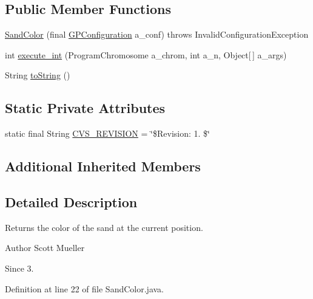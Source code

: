 \subsection*{Public Member Functions}
\begin{DoxyCompactItemize}
\item 
\hyperlink{classexamples_1_1gp_1_1painted_desert_1_1_sand_color_a8f1ed8fa161f20e7d178cb70041ea832}{Sand\-Color} (final \hyperlink{classorg_1_1jgap_1_1gp_1_1impl_1_1_g_p_configuration}{G\-P\-Configuration} a\-\_\-conf)  throws Invalid\-Configuration\-Exception 
\item 
int \hyperlink{classexamples_1_1gp_1_1painted_desert_1_1_sand_color_a5165d0fbe17b9d4e76e1e072739db6df}{execute\-\_\-int} (Program\-Chromosome a\-\_\-chrom, int a\-\_\-n, Object\mbox{[}$\,$\mbox{]} a\-\_\-args)
\item 
String \hyperlink{classexamples_1_1gp_1_1painted_desert_1_1_sand_color_af4b2de79f0c7496bc4f1a78e0c5d791b}{to\-String} ()
\end{DoxyCompactItemize}
\subsection*{Static Private Attributes}
\begin{DoxyCompactItemize}
\item 
static final String \hyperlink{classexamples_1_1gp_1_1painted_desert_1_1_sand_color_af06a8f8f70839b3a29cc1b023e138456}{C\-V\-S\-\_\-\-R\-E\-V\-I\-S\-I\-O\-N} = \char`\"{}\$Revision\-: 1. \$\char`\"{}
\end{DoxyCompactItemize}
\subsection*{Additional Inherited Members}


\subsection{Detailed Description}
Returns the color of the sand at the current position.

\begin{DoxyAuthor}{Author}
Scott Mueller 
\end{DoxyAuthor}
\begin{DoxySince}{Since}
3. 
\end{DoxySince}


Definition at line 22 of file Sand\-Color.\-java.



